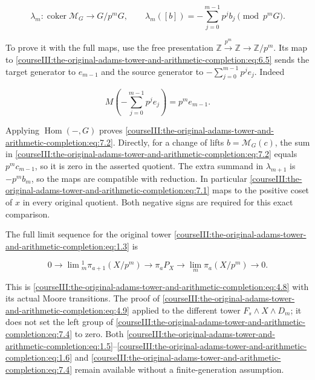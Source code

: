 \begin{equation}
\lambda_m:\operatorname{coker}\mathcal M_G\longrightarrow G/p^mG,
\qquad
\lambda_m([b])=-\sum_{j=0}^{m-1}p^j b_j\pmod{p^mG}.
\label{courseIII:the-original-adams-tower-and-arithmetic-completion:eq:7.2}
\end{equation}

To prove it with the full maps, use the free presentation
\(\mathbb Z\xrightarrow{p^m}\mathbb Z\to\mathbb Z/p^m\).
Its map to \eqref{courseIII:the-original-adams-tower-and-arithmetic-completion:eq:6.5} sends the target generator to \(e_{m-1}\) and the source generator to \(-\sum_{j=0}^{m-1}p^je_j\). Indeed

\begin{equation}
M\left(-\sum_{j=0}^{m-1}p^je_j\right)=p^me_{m-1}.
\label{courseIII:the-original-adams-tower-and-arithmetic-completion:eq:7.3}
\end{equation}

Applying \(\operatorname{Hom}(-,G)\) proves \eqref{courseIII:the-original-adams-tower-and-arithmetic-completion:eq:7.2}. Directly, for a change of lifts \(b=\mathcal M_G(c)\), the sum in \eqref{courseIII:the-original-adams-tower-and-arithmetic-completion:eq:7.2} equals \(p^mc_{m-1}\), so it is zero in the asserted quotient. The extra summand in \(\lambda_{m+1}\) is \(-p^mb_m\), so the maps are compatible with reduction. In particular \eqref{courseIII:the-original-adams-tower-and-arithmetic-completion:eq:7.1} maps to the positive coset of \(x\) in every original quotient. Both negative signs are required for this exact comparison.

The full limit sequence for the original tower \eqref{courseIII:the-original-adams-tower-and-arithmetic-completion:eq:1.3} is

\begin{equation}
0\longrightarrow\lim{}^1_m\pi_{a+1}(X/p^m)
\longrightarrow\pi_aP_X
\longrightarrow\lim_m\pi_a(X/p^m)\longrightarrow0.
\label{courseIII:the-original-adams-tower-and-arithmetic-completion:eq:7.4}
\end{equation}

This is \eqref{courseIII:the-original-adams-tower-and-arithmetic-completion:eq:4.8} with its actual Moore transitions. The proof of \eqref{courseIII:the-original-adams-tower-and-arithmetic-completion:eq:4.9} applied to the different tower \(F_s\wedge X\wedge D_m\); it does not set the left group of \eqref{courseIII:the-original-adams-tower-and-arithmetic-completion:eq:7.4} to zero. Both \eqref{courseIII:the-original-adams-tower-and-arithmetic-completion:eq:1.5}--\eqref{courseIII:the-original-adams-tower-and-arithmetic-completion:eq:1.6} and \eqref{courseIII:the-original-adams-tower-and-arithmetic-completion:eq:7.4} remain available without a finite-generation assumption.


